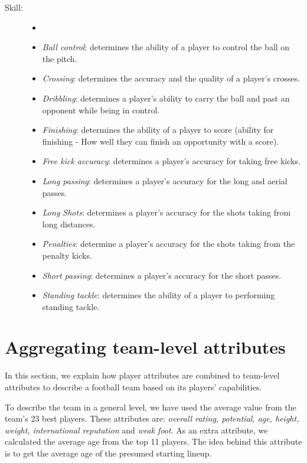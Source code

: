 \begin{description}
\begin{itemize}
    \end{itemize}
    \item[Skill:]
    \begin{itemize}
        \itemsep0.3em
        \item[]
        \item{\textit{Ball control}:} determines the ability of a player to control the ball on the pitch.
        \item{\textit{Crossing}:} determines the accuracy and the quality of a player's crosses.
        \item{\textit{Dribbling}:} determines a player's ability to carry the ball and past an opponent while being in control.
        \item{\textit{Finishing}:} determines the ability of a player to score (ability for finishing - How well they can finish an opportunity with a score).
        \item{\textit{Free kick accuracy}:} determines a player's accuracy for taking free kicks.
        \item{\textit{Long passing}:} determines a player's accuracy for the long and aerial passes.
        \item{\textit{Long Shots}:} determines a player's accuracy for the shots taking from long distances.
        \item{\textit{Penalties}:} determine a player's accuracy for the shots taking from the penalty kicks.
        \item{\textit{Short passing}:} determines a player's accuracy for the short passes.
        \item{\textit{Standing tackle}:} determines the ability of a player to performing standing tackle.

    \end{itemize}

\end{description}

\section{Aggregating team-level attributes}
In this section, we explain how player attributes are combined to team-level attributes to describe a football team based on its players' capabilities.

To describe the team in a general level, we have used the average value from the team's 23 best players. These attributes are: \textit{overall rating, potential, age, height, weight, international reputation} and \textit{weak foot}. As an extra attribute, we calculated the average age from the top 11 players. The idea behind this attribute is to get the average age of the presumed starting lineup.

